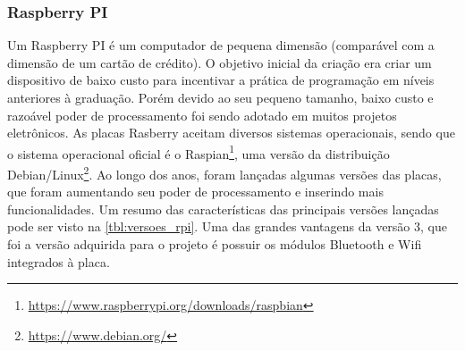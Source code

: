 	\subsubsection{Raspberry PI}
		Um Raspberry PI é um computador de pequena dimensão (comparável com a dimensão de um cartão de crédito). O objetivo inicial da criação era criar um dispositivo de baixo custo para incentivar a prática de programação em níveis anteriores à graduação. Porém devido ao seu pequeno tamanho, baixo custo e razoável poder de processamento foi sendo adotado em muitos projetos eletrônicos. As placas Rasberry aceitam diversos sistemas operacionais, sendo que o sistema operacional oficial é o Raspian\footnote{\url{https://www.raspberrypi.org/downloads/raspbian}}, uma versão da distribuição Debian/Linux\footnote{\url{https://www.debian.org/}}. Ao longo dos anos, foram lançadas algumas versões das placas, que foram aumentando seu poder de processamento e inserindo mais funcionalidades. Um resumo das características das principais versões lançadas pode ser visto na \autoref{tbl:versoes_rpi}. Uma das grandes vantagens da versão 3, que foi a versão adquirida para o projeto é possuir os módulos Bluetooth e Wifi integrados à placa.
		
